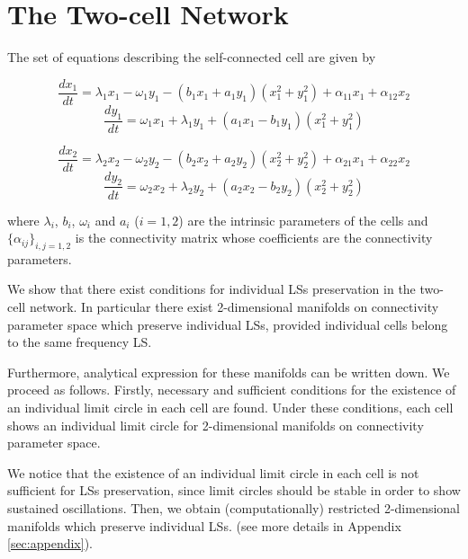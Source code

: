\section{The Two-cell Network}
The set of equations describing the self-connected cell are given by

\begin{equation}
    \frac{dx_{1}}{dt} = \lambda_{1} x_{1} - \omega_{1} y_{1} - (b_{1}x_{1} + a_{1}y_{1})(x_{1}^{2}+y_{1}^{2}) + \alpha_{11}x_{1} + \alpha_{12}x_{2}
    \label{es121}
\end{equation}
\begin{equation}
  \frac{dy_{1}}{dt} = \omega_{1} x_{1} + \lambda_{1} y_{1} + (a_{1}x_{1} - b_{1}y_{1})(x_{1}^{2}+y_{1}^{2})
   \label{es122}
\end{equation}

\begin{equation}
    \frac{dx_{2}}{dt} = \lambda_{2} x_{2} - \omega_{2} y_{2} - (b_{2}x_{2} + a_{2}y_{2})(x_{2}^{2}+y_{2}^{2}) + \alpha_{21}x_{1} + \alpha_{22}x_{2}
     \label{es123}
\end{equation}
\begin{equation}
  \frac{dy_{2}}{dt} = \omega_{2} x_{2} + \lambda_{2} y_{2} + (a_{2}x_{2} - b_{2}y_{2})(x_{2}^{2}+y_{2}^{2})
   \label{es124}
\end{equation}

where $\lambda_{i}$, $b_{i}$, $\omega_{i}$ and $a_{i}$ ($i=1,2$) are the intrinsic parameters of the cells and $\{\alpha_{ij}\}_{i,j=1,2}$ is the connectivity matrix whose coefficients are the connectivity parameters.

We show that there exist conditions for individual LSs preservation in the two-cell network. In particular there exist 2-dimensional manifolds on connectivity parameter space which preserve individual LSs, provided individual cells belong to the same frequency LS.

Furthermore, analytical expression for these manifolds can be written down. We proceed as follows. Firstly, necessary and sufficient conditions for the existence of an individual limit circle in each cell are found. Under these conditions, each cell shows an individual limit circle for 2-dimensional manifolds on connectivity parameter space.

We notice that the existence of an individual limit circle in each cell is not sufficient for LSs preservation, since limit circles should be stable in order to show sustained oscillations. Then, we obtain (computationally) restricted 2-dimensional manifolds which preserve individual LSs. (see more details in Appendix \ref{sec:appendix}).

